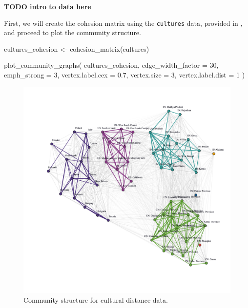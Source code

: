 \textbf{TODO intro to data here} \citep{muthukrishna2020beyond}

First, we will create the cohesion matrix using the \texttt{cultures}
data, provided in , and proceed to plot the community
structure.

\begin{Schunk}
\begin{Sinput}
cultures_cohesion <- cohesion_matrix(cultures)
\end{Sinput}
\end{Schunk}

\begin{Schunk}
\begin{Sinput}
plot_community_graphs(
  cultures_cohesion,
  edge_width_factor = 30,
  emph_strong = 3,
  vertex.label.cex = 0.7,
  vertex.size = 3,
  vertex.label.dist = 1
)
\end{Sinput}
\end{Schunk}

\begin{Schunk}
\begin{figure}
\includegraphics[width=1\linewidth]{fig7} \caption[Community structure for cultural distance data]{Community structure for cultural distance data.}\label{fig:figculture}
\end{figure}
\end{Schunk}


